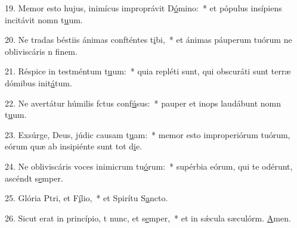 19. Memor esto hujus, inimícus improprávit D\uline{ó}mino:~* et pópulus insípiens incitávit nomn t\uline{u}um.\par 
20. Ne tradas béstiis ánimas confténtes t\uline{i}bi,~* et ánimas páuperum tuórum ne obliviscáris n f\uline{i}nem.\par 
21. Réspice in testméntum t\uline{u}um:~* quia repléti sunt, qui obscuráti sunt terræ dómibus init\uline{á}tum.\par 
22. Ne avertátur húmilis fctus conf\uline{ú}sus:~* pauper et inops laudábunt nomn t\uline{u}um.\par 
23. Exsúrge, Deus, júdic causam t\uline{u}am:~* memor esto improperiórum tuórum, eórum quæ ab insipiénte sunt tot d\uline{i}e.\par 
24. Ne obliviscáris voces inimicrum tu\uline{ó}rum:~* supérbia eórum, qui te odérunt, ascéndt s\uline{e}mper.\par 
25. Glória Ptri, et F\uline{í}lio,~* et Spirítu S\uline{a}ncto.\par 
26. Sicut erat in princípio, t nunc, et s\uline{e}mper,~* et in sǽcula sæculórm. \uline{A}men.\par 
